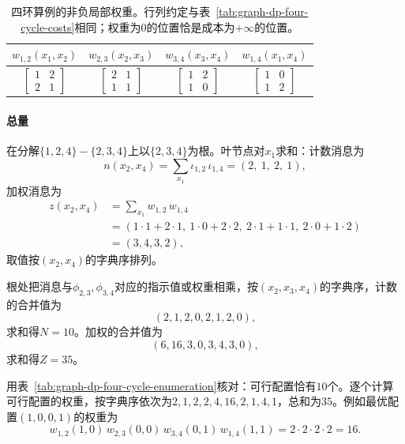 \begin{table}[!htb]
  \centering
  \begin{tabular}{cccc}
    \toprule
    $w_{1,2}(x_1,x_2)$ & $w_{2,3}(x_2,x_3)$ & $w_{3,4}(x_3,x_4)$ & $w_{1,4}(x_1,x_4)$\\
    \midrule
    $\begin{bmatrix}1&2\\2&1\end{bmatrix}$ &
    $\begin{bmatrix}2&1\\1&1\end{bmatrix}$ &
    $\begin{bmatrix}1&2\\1&0\end{bmatrix}$ &
    $\begin{bmatrix}1&0\\1&2\end{bmatrix}$\\
    \bottomrule
  \end{tabular}
  \caption{四环算例的非负局部权重。行列约定与表~\ref{tab:graph-dp-four-cycle-costs}相同；权重为$0$的位置恰是成本为$+\infty$的位置。}
  \label{tab:graph-dp-four-cycle-weights}
\end{table}

\paragraph{总量}
在分解$\{1,2,4\}-\{2,3,4\}$上以$\{2,3,4\}$为根。叶节点对$x_1$求和：计数消息为
\[
n(x_2,x_4)=\sum_{x_1}\iota_{1,2}\,\iota_{1,4}=(2,\ 1,\ 2,\ 1),
\]
加权消息为
\[
\begin{aligned}
z(x_2,x_4)&=\sum_{x_1}w_{1,2}\,w_{1,4}\\
&=(1\cdot1+2\cdot1,\ 1\cdot0+2\cdot2,\ 2\cdot1+1\cdot1,\ 2\cdot0+1\cdot2)\\
&=(3,4,3,2),
\end{aligned}
\]
取值按$(x_2,x_4)$的字典序排列。

根处把消息与$\phi_{2,3},\phi_{3,4}$对应的指示值或权重相乘，按$(x_2,x_3,x_4)$的字典序，计数的合并值为
\[
(2,1,2,0,2,1,2,0),
\]
求和得$N=10$。加权的合并值为
\[
(6,16,3,0,3,4,3,0),
\]
求和得$Z=35$。

用表~\ref{tab:graph-dp-four-cycle-enumeration}核对：可行配置恰有$10$个。逐个计算可行配置的权重，按字典序依次为$2,1,2,2,4,16,2,1,4,1$，总和为$35$。例如最优配置$(1,0,0,1)$的权重为
\[
w_{1,2}(1,0)\,w_{2,3}(0,0)\,w_{3,4}(0,1)\,w_{1,4}(1,1)=2\cdot2\cdot2\cdot2=16.
\]


